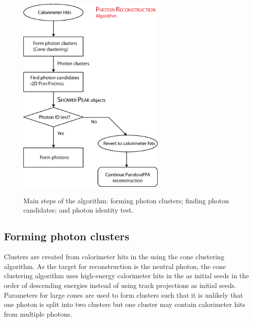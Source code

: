 \begin{figure}[tbph]
\centering
{\includegraphics[width=0.65\textwidth]{photon/photonRecoFlow3}}
\caption[A flow diagram of the \PhotonReconstruction algorithm.]
{Main steps of the \PhotonReconstruction algorithm: forming photon clusters; finding photon candidates; and photon identity test.}
\label{fig:photonPhotonRecoFlow}
\end{figure}


\subsection{Forming photon clusters}



Clusters are created from calorimeter hits in the \ECAL using the cone clustering algorithm. As the target for reconstruction is the neutral photon, the cone clustering algorithm uses high-energy calorimeter hits in the \ECAL as initial seeds in the order of descending energies instead of using track projections as initial seeds.  Parameters for large cones are used to form clusters such that it is unlikely that one photon is split into two clusters but one cluster may contain calorimeter hits from  multiple photons.

